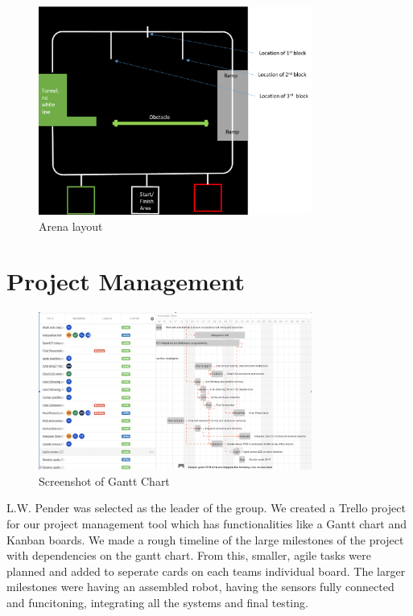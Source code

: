 \documentclass{article}
\begin{document}
\begin{figure}[!h]
    \centering
    \includegraphics[width=0.8\textwidth]{assets/arena.png}
    \caption{Arena layout}
    \label{fig:arena}
\end{figure}

\section{Project Management}

\begin{figure}[!h]
    \centering
    \includegraphics[width=0.8\textwidth]{assets/Gantt.png}
    \caption{Screenshot of Gantt Chart}
    \label{fig:gantt}
\end{figure}

\quad L.W. Pender was selected as the leader of the group. We created a Trello project for our project management tool which has functionalities like a Gantt chart and Kanban boards. We made a rough timeline of the large milestones of the project with dependencies on the gantt chart. From this, smaller, agile tasks were planned and added to seperate cards on each teams individual board. The larger milestones were having an assembled robot, having the sensors fully connected and funcitoning, integrating all the systems and final testing.
    
\end{document}
